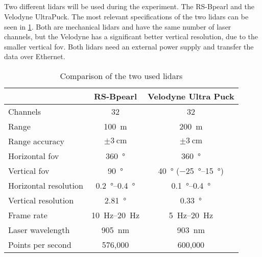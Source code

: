 \subsection{}
Two different \gls{lidar}s will be used during the experiment.
The RS-Bpearl and the Velodyne UltraPuck.
The most relevant specifications of the two \gls{lidar}s can be seen in \cref{tab:lidar_datasheets}.
Both are mechanical \gls{lidar}s and have the same number of laser channels, but the Velodyne has a significant better vertical resolution, due to the smaller vertical \gls{fov}.
Both \gls{lidar}s need an external power supply and transfer the data over Ethernet.
\begin{table}[ht]
	\centering
	\caption{Comparison of the two used \acrshort{lidar}s \cite{RoboSense2020, Velodyne2018}}
	\label{tab:lidar_datasheets}
	\begin{tabular}[t]{lcc}
		\toprule
		                      & \textbf{RS-Bpearl}          & \textbf{Velodyne Ultra Puck}                  \\
		\midrule
		Channels              & 32                          & 32                                            \\
		Range                 & \SI{100}{\metre}            & \SI{200}{\metre}                              \\
		Range accuracy        & $\pm\SI{3}{\centi\metre}$   & $\pm\SI{3}{\centi\metre}$                     \\
		Horizontal \gls{fov}  & \SI{360}{\degree}           & \SI{360}{\degree}                             \\
		Vertical \gls{fov}    & \SI{90}{\degree}            & \SI{40}{\degree} (\SIrange{-25}{15}{\degree}) \\
		Horizontal resolution & \SIrange{0.2}{0.4}{\degree} & \SIrange{0.1}{0.4}{\degree}                   \\
		Vertical resolution   & \SI{2.81}{\degree}          & \SI{0.33}{\degree}                            \\
		Frame rate            & \SIrange{10}{20}{\hertz}    & \SIrange{5}{20}{\hertz}                       \\
		Laser wavelength      & \SI{905}{\nano\metre}       & \SI{903}{\nano\metre}                         \\
		Points per second     & 576,000                     & 600,000                                       \\
		\bottomrule
	\end{tabular}
\end{table}%
